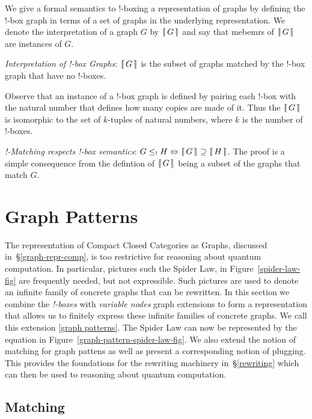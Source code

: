 \documentclass[runningheads]{llncs}
\newcommand{\binterp}[1]{\lceil\hspace{-0.27em}|\, #1\, |\hspace{-0.27em}\rceil}
\begin{document}
We give a formal semantics to !-boxing a representation of graphs by
defining the !-box graph in terms of a set of graphs in the
underlying representation. We denote the interpretation of a graph $G$
by $\binterp{G}$ and say that mebemrs of $\binterp{G}$ are instances
of $G$. 

\begin{definition}
  \emph{Interpretation of !-box Graphs}: $\binterp{G}$ is the subset
  of graphs matched by the !-box graph that have no !-boxes.
\end{definition}

Observe that an instance of a !-box graph is defined by pairing each
!-box with the natural number that defines how many copies are made of
it. Thus the $\binterp{G}$ is isomorphic to the set of $k$-tuples of
natural numbers, where $k$ is the number of !-boxes.

\begin{theorem}
  \emph{!-Matching respects !-box semantics}: $G \leq_! H
  \Leftrightarrow \binterp{G} \supseteq \binterp{H}$. The proof is a
  simple consequence from the defintion of $\binterp{G}$ being a
  subset of the graphs that match $G$.
\end{theorem}


\section{Graph Patterns}
\label{sec:patterns}

The representation of Compact Closed Categories as Graphs, discussed
in~\S\ref{graph-repr-comp}, is too restrictive for reasoning about
quantum computation. In particular, pictures such the Spider Law, in
Figure~\ref{spider-law-fig} are frequently needed, but not
expressible. Such pictures are used to denote an infinite family of
concrete graphs that can be rewritten. In this section we combine the
{\em !-boxes} with {\em variable nodes} graph extensions to form a
representation that allows us to finitely express these infinite
families of concrete graphs. We call this extension \ref{graph
  patterns}. The Spider Law can now be represented by the equation in
Figure~\ref{graph-pattern-spider-law-fig}. We also extend the notion
of matching for graph pattens as well as present a corresponding
notion of plugging. This provides the foundations for the rewriting
machinery in~\S\ref{rewriting} which can then be used to reasoning
about quantum computation.

\subsection{Matching}
\end{document}
